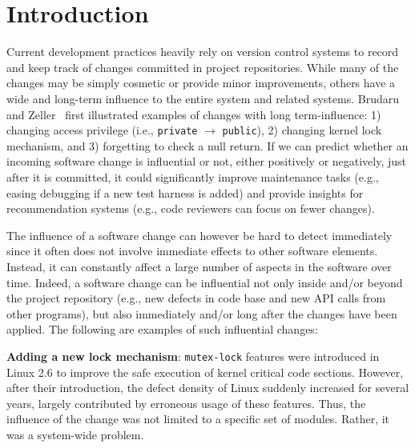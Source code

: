 \section{Introduction}
\label{sec:intro}

Current development practices heavily rely on version control systems to
record and keep track of changes committed in project repositories. While many
of the changes may be simply cosmetic or provide minor improvements, others
have a wide and long-term influence to the entire system and related systems.
Brudaru and Zeller~\cite{brudaru_what_2008} first illustrated examples of 
changes with long term-influence: 1) changing access privilege
(i.e., \texttt{private} $\rightarrow$ \texttt{public}), 2) changing kernel
lock mechanism, and 3) forgetting to check a null return. If we can predict
whether an incoming software change is influential or not, either positively
or negatively, just after it is committed, it could significantly improve
maintenance tasks (e.g., easing debugging if a new test harness is added) and provide insights for recommendation systems (e.g., code reviewers can focus on fewer changes).


The influence of a software change can however be hard to detect immediately since it often does
not involve immediate effects to other software elements. Instead, it can
constantly affect a large number of aspects in the software over time. Indeed,
a software change can be influential not only inside and/or beyond the project
repository (e.g., new defects in code base and new API calls from other
programs), but also immediately and/or  long after the changes have been
applied. The
following are examples of such influential changes:

{\bf Adding a new lock mechanism}: {\tt mutex-lock} features were introduced in 
Linux 2.6 to improve the safe execution of kernel critical code sections. However,
after their introduction, the defect density of Linux suddenly increased for 
several years, largely contributed by erroneous usage of these features.
Thus, the influence of the change was not limited to a specific set of modules.
Rather, it was a system-wide problem. 


